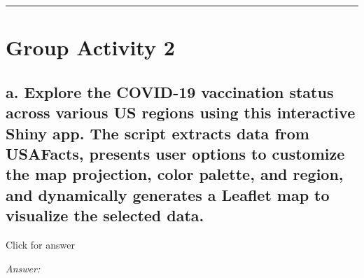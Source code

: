 \documentclass[
]{book}
\begin{document}
\begin{center}\rule{0.5\linewidth}{0.5pt}\end{center}

\hypertarget{group-activity-2-5}{%
\section{Group Activity 2}\label{group-activity-2-5}}

\hypertarget{a.-explore-the-covid-19-vaccination-status-across-various-us-regions-using-this-interactive-shiny-app.-the-script-extracts-data-from-usafacts-presents-user-options-to-customize-the-map-projection-color-palette-and-region-and-dynamically-generates-a-leaflet-map-to-visualize-the-selected-data.}{%
\subsection{a. Explore the COVID-19 vaccination status across various US regions using this interactive Shiny app. The script extracts data from USAFacts, presents user options to customize the map projection, color palette, and region, and dynamically generates a Leaflet map to visualize the selected data.}\label{a.-explore-the-covid-19-vaccination-status-across-various-us-regions-using-this-interactive-shiny-app.-the-script-extracts-data-from-usafacts-presents-user-options-to-customize-the-map-projection-color-palette-and-region-and-dynamically-generates-a-leaflet-map-to-visualize-the-selected-data.}}

Click for answer

\emph{Answer:}
\end{document}
